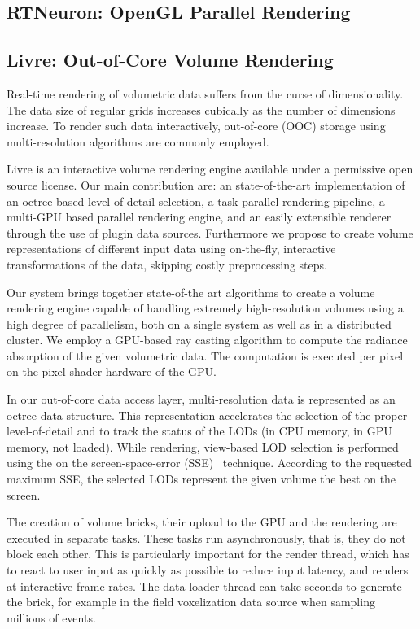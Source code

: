 \documentclass[10pt]{llncs}
\newcommand{\FIXME}[1]{\textbf{\color{BLUE}{FIXME: #1}}}
\begin{document}
\FIXME{teaser gallery}

\subsection{RTNeuron: OpenGL Parallel Rendering}

\subsection{Livre: Out-of-Core Volume Rendering}

Real-time rendering of volumetric data suffers from the curse of
dimensionality. The data size of regular grids increases cubically as the number
of dimensions increase. To render such data interactively, out-of-core (OOC)
storage using multi-resolution algorithms are commonly employed.

Livre is an interactive volume rendering engine available under a permissive
open source license. Our main contribution are: an state-of-the-art
implementation of an octree-based level-of-detail selection, a task parallel
rendering pipeline, a multi-GPU based parallel rendering engine, and an easily
extensible renderer through the use of plugin data sources. Furthermore we
propose to create volume representations of different input data using
on-the-fly, interactive transformations of the data, skipping costly
preprocessing steps.

Our system brings together state-of-the art algorithms to create a volume
rendering engine capable of handling extremely high-resolution volumes using a
high degree of parallelism, both on a single system as well as in a distributed
cluster. We employ a GPU-based ray casting algorithm to compute the radiance
absorption of the given volumetric data. The computation is executed per pixel
on the pixel shader hardware of the GPU.

In our out-of-core data access layer, multi-resolution data is represented as an
octree data structure. This representation accelerates the selection of the
proper level-of-detail and to track the status of the LODs (in CPU memory, in
GPU memory, not loaded). While rendering, view-based LOD selection is performed
using the on the screen-space-error (SSE)~\cite{guthe2004} technique. According
to the requested maximum SSE, the selected LODs represent the given volume the
best on the screen.

The creation of volume bricks, their upload to the GPU and the rendering are
executed in separate tasks. These tasks run asynchronously, that is, they do not
block each other. This is particularly important for the render thread, which
has to react to user input as quickly as possible to reduce input latency, and
renders at interactive frame rates. The data loader thread can take seconds to
generate the brick, for example in the field voxelization data source when
sampling millions of events.
\end{document}
